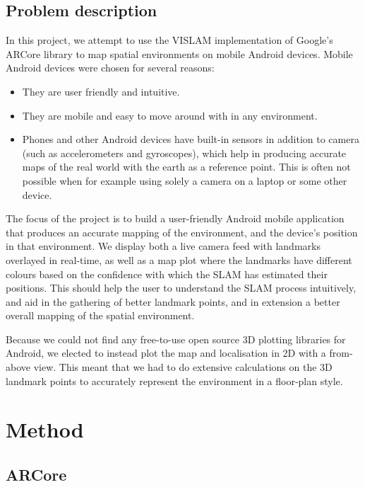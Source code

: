 \documentclass{article}
\begin{document}
\subsection{Problem description}
In this project, we attempt to use the VISLAM implementation of Google's ARCore library \cite{ARCore} to map spatial environments on mobile Android devices. Mobile Android devices were chosen for several reasons:
\begin{itemize}
    \item They are user friendly and intuitive.
    \item They are mobile and easy to move around with in any environment.
    \item Phones and other Android devices have built-in sensors in addition to camera (such as accelerometers and gyroscopes), which help in producing accurate maps of the real world with the earth as a reference point. This is often not possible when for example using solely a camera on a laptop or some other device.
\end{itemize}

The focus of the project is to build a user-friendly Android mobile application that produces an accurate mapping of the environment, and the device's position in that environment. We display both a live camera feed with landmarks overlayed in real-time, as well as a map plot where the landmarks have different colours based on the confidence with which the SLAM has estimated their positions. This should help the user to understand the SLAM process intuitively, and aid in the gathering of better landmark points, and in extension a better overall mapping of the spatial environment.

Because we could not find any free-to-use open source 3D plotting libraries for Android, we elected to instead plot the map and localisation in 2D with a from-above view. This meant that we had to do extensive calculations on the 3D landmark points to accurately represent the environment in a floor-plan style.



\section{Method}
\subsection{ARCore}
\end{document}
